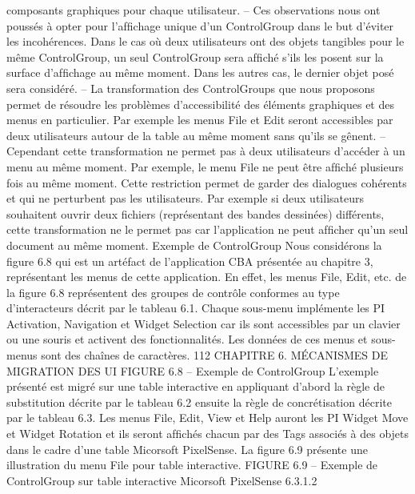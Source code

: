 \documentclass{article}
\begin{document}
composants graphiques pour chaque utilisateur.
– Ces observations nous ont pouss\'{e}s \`{a} opter pour l’afﬁchage unique d’un ControlGroup dans le
but d’\'{e}viter les incoh\'{e}rences. Dans le cas o\`{u} deux utilisateurs ont des objets tangibles pour le
m\^{e}me ControlGroup, un seul ControlGroup sera afﬁch\'{e} s’ils les posent sur la surface d’afﬁchage au m\^{e}me moment. Dans les autres cas, le dernier objet pos\'{e} sera consid\'{e}r\'{e}.
– La transformation des ControlGroups que nous proposons permet de r\'{e}soudre les probl\`{e}mes
d’accessibilit\'{e} des \'{e}l\'{e}ments graphiques et des menus en particulier. Par exemple les menus File
et Edit seront accessibles par deux utilisateurs autour de la table au m\^{e}me moment sans qu’ils
se g\^{e}nent.
– Cependant cette transformation ne permet pas \`{a} deux utilisateurs d’acc\'{e}der \`{a} un menu au m\^{e}me
moment. Par exemple, le menu File ne peut \^{e}tre afﬁch\'{e} plusieurs fois au m\^{e}me moment. Cette
restriction permet de garder des dialogues coh\'{e}rents et qui ne perturbent pas les utilisateurs. Par
exemple si deux utilisateurs souhaitent ouvrir deux ﬁchiers (repr\'{e}sentant des bandes dessin\'{e}es)
diff\'{e}rents, cette transformation ne le permet pas car l’application ne peut afﬁcher qu’un seul
document au m\^{e}me moment.
Exemple de ControlGroup
Nous consid\'{e}rons la ﬁgure 6.8 qui est un art\'{e}fact de l’application CBA
pr\'{e}sent\'{e}e au chapitre 3, repr\'{e}sentant les menus de cette application. En effet, les menus File, Edit, etc.
de la ﬁgure 6.8 repr\'{e}sentent des groupes de contr\^{o}le conformes au type d’interacteurs d\'{e}crit par le
tableau 6.1. Chaque sous-menu impl\'{e}mente les PI Activation, Navigation et Widget Selection car ils
sont accessibles par un clavier ou une souris et activent des fonctionnalit\'{e}s. Les donn\'{e}es de ces menus
et sous-menus sont des cha\^{i}nes de caract\`{e}res.
112
CHAPITRE 6. MÉCANISMES DE MIGRATION DES UI
FIGURE 6.8 – Exemple de ControlGroup
L’exemple pr\'{e}sent\'{e} est migr\'{e} sur une table interactive en appliquant d’abord la r\`{e}gle de substitution d\'{e}crite par le tableau 6.2 ensuite la r\`{e}gle de concr\'{e}tisation d\'{e}crite par le tableau 6.3. Les menus
File, Edit, View et Help auront les PI Widget Move et Widget Rotation et ils seront afﬁch\'{e}s chacun par
des Tags associ\'{e}s \`{a} des objets dans le cadre d’une table Micorsoft PixelSense. La ﬁgure 6.9 pr\'{e}sente
une illustration du menu File pour table interactive.
FIGURE 6.9 – Exemple de ControlGroup sur table interactive Micorsoft PixelSense
6.3.1.2
\end{document}
